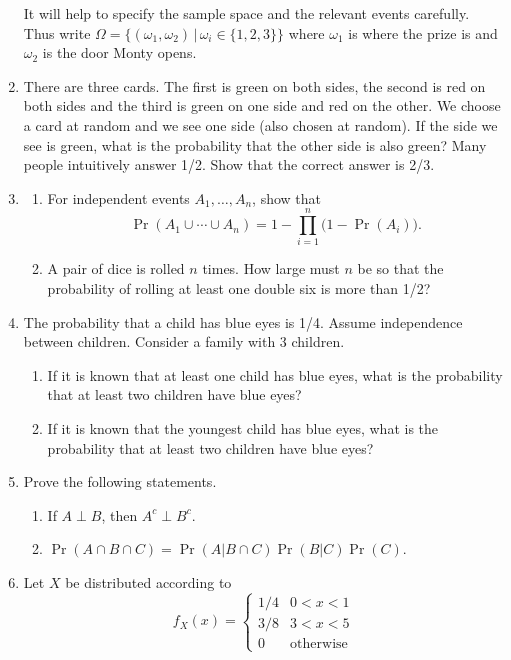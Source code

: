 \documentclass[
]{book}
\providecommand{\tightlist}{%
  \setlength{\itemsep}{0pt}\setlength{\parskip}{0pt}}
\theoremstyle{definition}
\theoremstyle{definition}
\theoremstyle{definition}
\theoremstyle{definition}
\theoremstyle{remark}
\begin{document}
\begin{enumerate}
  It will help to specify the sample space and the relevant events carefully. Thus write \(\Omega = \big\{(\omega_1,\omega_2) \,|\, \omega_i \in \{1,2,3\}\big\}\) where \(\omega_1\) is where the prize is and \(\omega_2\) is the door Monty opens.
\item
  There are three cards. The first is green on both sides, the second is red on both sides and the third is green on one side and red on the other. We choose a card at random and we see one side (also chosen at random). If the side we see is green, what is the probability that the other side is also green? Many people intuitively answer 1/2. Show that the correct answer is 2/3.
\item
  \begin{enumerate}
  \def\labelenumii{(\alph{enumii})}
  \item
    For independent events \(A_1,\dots,A_n\), show that
    \[\Pr(A_1 \cup \cdots \cup A_n) = 1 - \prod_{i=1}^n \big(1 - \Pr(A_i)\big).\]
  \item
    A pair of dice is rolled \(n\) times. How large must \(n\) be so that the probability of rolling at least one double six is more than 1/2?
  \end{enumerate}
\item
  The probability that a child has blue eyes is 1/4. Assume independence between children. Consider a family with 3 children.

  \begin{enumerate}
  \def\labelenumii{(\alph{enumii})}
  \tightlist
  \item
    If it is known that at least one child has blue eyes, what is the probability that at least two children have blue eyes?
  \item
    If it is known that the youngest child has blue eyes, what is the probability that at least two children have blue eyes?
  \end{enumerate}
\item
  Prove the following statements.

  \begin{enumerate}
  \def\labelenumii{(\alph{enumii})}
  \tightlist
  \item
    If \(A \perp B\), then \(A^c \perp B^c\).
  \item
    \(\Pr(A \cap B \cap C) = \Pr(A| B \cap C)\Pr(B|C)\Pr(C)\).
  \end{enumerate}
\item
  Let \(X\) be distributed according to
  \[
  f_X(x) = \begin{cases}
   1/4&0<x<1\\
   3/8&3<x<5 \\
   0&\text{otherwise}
  \end{cases}
  \]


\end{enumerate}
\end{document}
